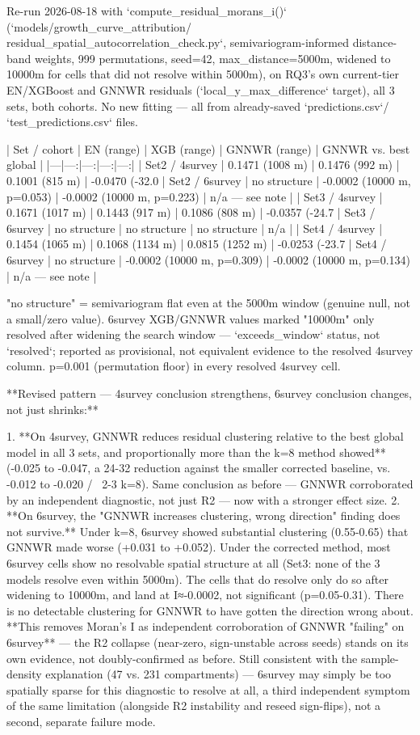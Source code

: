 Re-run 2026-08-18 with `compute_residual_morans_i()` (`models/growth_curve_attribution/
residual_spatial_autocorrelation_check.py`, semivariogram-informed distance-band weights, 999
permutations, seed=42, max_distance=5000m, widened to 10000m for cells that did not resolve within
5000m), on RQ3's own current-tier EN/XGBoost and GNNWR residuals (`local_y_max_difference` target),
all 3 sets, both cohorts. No new fitting — all from already-saved `predictions.csv`/
`test_predictions.csv` files.

| Set / cohort | EN (range) | XGB (range) | GNNWR (range) | GNNWR vs. best global |
|---|---:|---:|---:|---:|
| Set2 / 4survey | 0.1471 (1008 m) | 0.1476 (992 m) | 0.1001 (815 m) | -0.0470 (-32.0%
| Set2 / 6survey | no structure | -0.0002 (10000 m, p=0.053) | -0.0002 (10000 m, p=0.223) | n/a — see note |
| Set3 / 4survey | 0.1671 (1017 m) | 0.1443 (917 m) | 0.1086 (808 m) | -0.0357 (-24.7%
| Set3 / 6survey | no structure | no structure | no structure | n/a |
| Set4 / 4survey | 0.1454 (1065 m) | 0.1068 (1134 m) | 0.0815 (1252 m) | -0.0253 (-23.7%
| Set4 / 6survey | no structure | -0.0002 (10000 m, p=0.309) | -0.0002 (10000 m, p=0.134) | n/a — see note |

"no structure" = semivariogram flat even at the 5000m window (genuine null, not a small/zero
value). 6survey XGB/GNNWR values marked "10000m" only resolved after widening the search window —
`exceeds_window` status, not `resolved`; reported as provisional, not equivalent evidence to the
resolved 4survey column. p=0.001 (permutation floor) in every resolved 4survey cell.

**Revised pattern — 4survey conclusion strengthens, 6survey conclusion changes, not just shrinks:**

1. **On 4survey, GNNWR reduces residual clustering relative to the best global model in all 3
   sets, and proportionally more than the k=8 method showed** (-0.025 to -0.047, a 24-32%
   reduction against the smaller corrected baseline, vs. -0.012 to -0.020 / ~2-3%
   k=8). Same conclusion as before — GNNWR corroborated by an independent diagnostic, not just
   R2 — now with a stronger effect size.
2. **On 6survey, the "GNNWR increases clustering, wrong direction" finding does not survive.**
   Under k=8, 6survey showed substantial clustering (0.55-0.65) that GNNWR made worse (+0.031 to
   +0.052). Under the corrected method, most 6survey cells show no resolvable spatial structure at
   all (Set3: none of the 3 models resolve even within 5000m). The cells that do resolve only do
   so after widening to 10000m, and land at I≈-0.0002, not significant (p=0.05-0.31). There is no
   detectable clustering for GNNWR to have gotten the direction wrong about. **This removes Moran's
   I as independent corroboration of GNNWR "failing" on 6survey** — the R2 collapse (near-zero,
   sign-unstable across seeds) stands on its own evidence, not doubly-confirmed as before. Still
   consistent with the sample-density explanation (47 vs. 231 compartments) — 6survey may simply
   be too spatially sparse for this diagnostic to resolve at all, a third independent symptom of
   the same limitation (alongside R2 instability and reseed sign-flips), not a second, separate
   failure mode.

